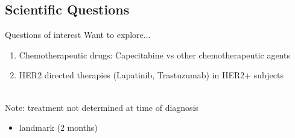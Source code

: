 \subsection{Scientific Questions}
\begin{frame}{Questions of interest}
Want to explore...
\begin{enumerate}
 \item Chemotherapeutic drugs: Capecitabine vs other chemotherapeutic agents
 \item HER2 directed therapies (Lapatinib, Trastuzumab) in HER2+ subjects \\~\\
 \end{enumerate}
 
 
 Note: treatment not determined at time of diagnosis 
 \begin{itemize}
  \item landmark (2 months) 
 \end{itemize}
 

\end{frame}


